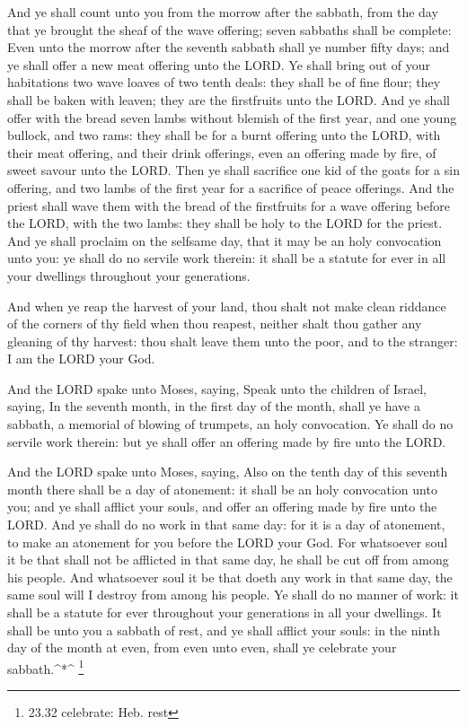 And ye shall count unto you from the morrow after the
sabbath, from the day that ye brought the sheaf of the wave offering;
seven sabbaths shall be complete:  Even unto the morrow
after the seventh sabbath shall ye number fifty days; and ye shall offer
a new meat offering unto the LORD.  Ye shall bring out of
your habitations two wave loaves of two tenth deals: they shall be of
fine flour; they shall be baken with leaven; they are the firstfruits
unto the LORD.  And ye shall offer with the bread seven
lambs without blemish of the first year, and one young bullock, and two
rams: they shall be for a burnt offering unto the LORD, with their meat
offering, and their drink offerings, even an offering made by fire, of
sweet savour unto the LORD.  Then ye shall sacrifice one
kid of the goats for a sin offering, and two lambs of the first year for
a sacrifice of peace offerings.  And the priest shall wave
them with the bread of the firstfruits for a wave offering before the
LORD, with the two lambs: they shall be holy to the LORD for the priest.
 And ye shall proclaim on the selfsame day, that it may be
an holy convocation unto you: ye shall do no servile work therein: it
shall be a statute for ever in all your dwellings throughout your
generations.

 And when ye reap the harvest of your land, thou shalt not
make clean riddance of the corners of thy field when thou reapest,
neither shalt thou gather any gleaning of thy harvest: thou shalt leave
them unto the poor, and to the stranger: I am the LORD your God.

 And the LORD spake unto Moses, saying,  Speak
unto the children of Israel, saying, In the seventh month, in the first
day of the month, shall ye have a sabbath, a memorial of blowing of
trumpets, an holy convocation.  Ye shall do no servile work
therein: but ye shall offer an offering made by fire unto the LORD.

 And the LORD spake unto Moses, saying,  Also
on the tenth day of this seventh month there shall be a day of
atonement: it shall be an holy convocation unto you; and ye shall
afflict your souls, and offer an offering made by fire unto the LORD.
 And ye shall do no work in that same day: for it is a day
of atonement, to make an atonement for you before the LORD your God.
 For whatsoever soul it be that shall not be afflicted in
that same day, he shall be cut off from among his people. 
And whatsoever soul it be that doeth any work in that same day, the same
soul will I destroy from among his people.  Ye shall do no
manner of work: it shall be a statute for ever throughout your
generations in all your dwellings.  It shall be unto you a
sabbath of rest, and ye shall afflict your souls: in the ninth day of
the month at even, from even unto even, shall ye celebrate your
sabbath.\^{}*\^{} \footnote{23.32 celebrate: Heb. rest}

